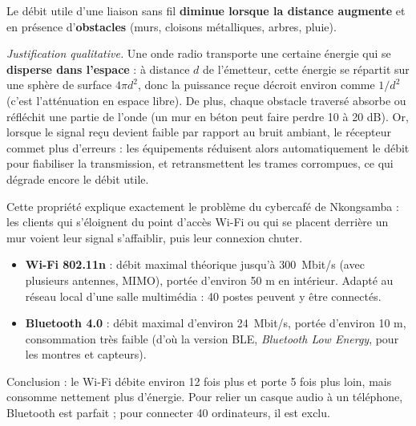 \documentclass[11pt]{article}
\newcommand{\cle}[1]{{\popxbold\color{popdark}#1}}
\begin{document}
\begin{propriete}
Le débit utile d'une liaison sans fil \textbf{diminue lorsque la distance augmente} et en présence d'\textbf{obstacles} (murs, cloisons métalliques, arbres, pluie).

\emph{Justification qualitative.} Une onde radio transporte une certaine énergie qui se \textbf{disperse dans l'espace} : à distance $d$ de l'émetteur, cette énergie se répartit sur une sphère de surface $4\pi d^{2}$, donc la puissance reçue décroit environ comme $1/d^{2}$ (c'est l'\cle{atténuation en espace libre}). De plus, chaque obstacle traversé absorbe ou réfléchit une partie de l'onde (un mur en béton peut faire perdre 10 à 20 dB). Or, lorsque le signal reçu devient faible par rapport au bruit ambiant, le récepteur commet plus d'erreurs : les équipements réduisent alors automatiquement le débit pour fiabiliser la transmission, et retransmettent les trames corrompues, ce qui dégrade encore le débit utile.
\end{propriete}

Cette propriété explique exactement le problème du cybercafé de Nkongsamba : les clients qui s'éloignent du point d'accès Wi-Fi ou qui se placent derrière un mur voient leur signal s'affaiblir, puis leur connexion chuter.

\begin{exemplebox}
\begin{itemize}
\item \textbf{Wi-Fi 802.11n} : débit maximal théorique jusqu'à \SI{300}{Mbit/s} (avec plusieurs antennes, MIMO), portée d'environ 50 m en intérieur. Adapté au réseau local d'une salle multimédia : 40 postes peuvent y être connectés.
\item \textbf{Bluetooth 4.0} : débit maximal d'environ \SI{24}{Mbit/s}, portée d'environ 10 m, consommation très faible (d'où la version BLE, \emph{Bluetooth Low Energy}, pour les montres et capteurs).
\end{itemize}
Conclusion : le Wi-Fi débite environ 12 fois plus et porte 5 fois plus loin, mais consomme nettement plus d'énergie. Pour relier un casque audio à un téléphone, Bluetooth est parfait ; pour connecter 40 ordinateurs, il est exclu.
\end{exemplebox}
\end{document}
